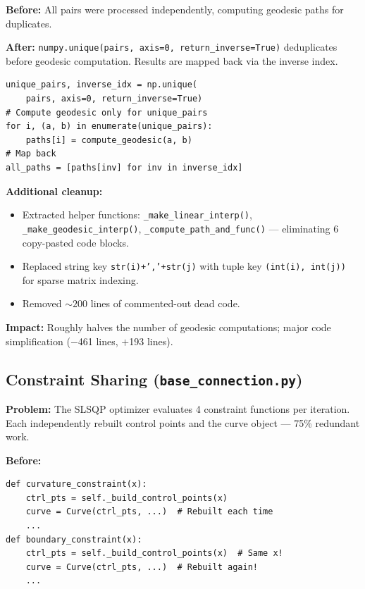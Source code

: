 \documentclass[11pt,a4paper]{article}
\begin{document}
\textbf{Before:} All pairs were processed independently, computing geodesic paths for duplicates.

\textbf{After:} \texttt{numpy.unique(pairs, axis=0, return\_inverse=True)} deduplicates before geodesic computation. Results are mapped back via the inverse index.
\begin{lstlisting}
unique_pairs, inverse_idx = np.unique(
    pairs, axis=0, return_inverse=True)
# Compute geodesic only for unique_pairs
for i, (a, b) in enumerate(unique_pairs):
    paths[i] = compute_geodesic(a, b)
# Map back
all_paths = [paths[inv] for inv in inverse_idx]
\end{lstlisting}

\textbf{Additional cleanup:}
\begin{itemize}[nosep]
    \item Extracted helper functions: \texttt{\_make\_linear\_interp()}, \texttt{\_make\_geodesic\_interp()}, \texttt{\_compute\_path\_and\_func()} --- eliminating 6 copy-pasted code blocks.
    \item Replaced string key \texttt{str(i)+','+str(j)} with tuple key \texttt{(int(i), int(j))} for sparse matrix indexing.
    \item Removed ${\sim}200$ lines of commented-out dead code.
\end{itemize}

\textbf{Impact:} Roughly halves the number of geodesic computations; major code simplification ($-$461 lines, $+$193 lines).

\subsection{Constraint Sharing (\texttt{base\_connection.py})}

\textbf{Problem:} The SLSQP optimizer evaluates 4 constraint functions per iteration. Each independently rebuilt control points and the curve object --- 75\% redundant work.

\textbf{Before:}
\begin{lstlisting}
def curvature_constraint(x):
    ctrl_pts = self._build_control_points(x)
    curve = Curve(ctrl_pts, ...)  # Rebuilt each time
    ...
def boundary_constraint(x):
    ctrl_pts = self._build_control_points(x)  # Same x!
    curve = Curve(ctrl_pts, ...)  # Rebuilt again!
    ...
\end{lstlisting}
\end{document}
